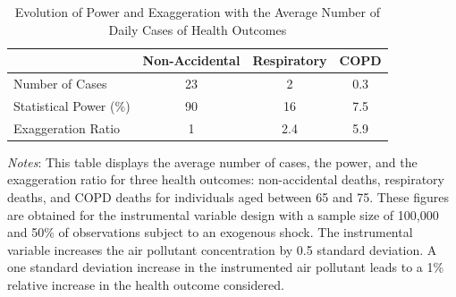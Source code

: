 \begin{table}[!ht]
    \caption{Evolution of Power and Exaggeration with the Average Number of Daily Cases of Health Outcomes}
    \label{tab:n_cases}
    \centering
            \begin{threeparttable}
                \begin{tabular}{lccc}
                    \toprule
                                         & Non-Accidental & Respiratory & COPD \\ \midrule
Number of Cases & 23                       & 2                     & 0.3                          \\
Statistical Power (\%)  & 90                       & 16                    & 7.5                          \\
Exaggeration Ratio      & 1                        & 2.4                   & 5.9                          \\ \bottomrule
                \end{tabular}
                \begin{tablenotes}
                    \footnotesize
                    \item \textit{Notes}: This table displays the average number of cases, the power, and the exaggeration ratio for three health outcomes: non-accidental deaths, respiratory deaths, and COPD deaths for individuals aged between 65 and 75. These figures are obtained for the instrumental variable design with a sample size of 100,000 and 50\% of observations subject to an exogenous shock. The instrumental variable increases the air pollutant concentration by 0.5 standard deviation. A one standard deviation increase in the instrumented air pollutant leads to a 1\% relative increase in the health outcome considered.
                \end{tablenotes}
            \end{threeparttable}
\end{table}